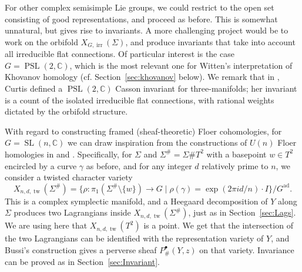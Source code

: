 \documentclass [11pt]{amsart}
\theoremstyle{remark}
\def\cc {{\mathbb{C}}}
\def\Gad{G^{\operatorname{ad}}}
\def\psl {{\operatorname{PSL}(2, \cc)}}
\def\sln {{\operatorname{SL}(n, \cc)}}
\def\Char {X}
\def\irr{\operatorname{irr}}
\def\tw{\operatorname{tw}}
\begin{document}
For other complex semisimple Lie groups, we could restrict to the open set consisting of good representations, and proceed as before. This is somewhat unnatural, but gives rise to invariants. A more challenging project would be to work on the orbifold $\Char_{G, \irr}(\Sigma)$, and produce invariants that take into account all irreducible flat connections. Of particular interest is the case $G = \psl$, which is the most relevant one for Witten's interpretation of Khovanov homology (cf. Section~\ref{sec:khovanov} below). We remark that in \cite{CurtisPSL}, Curtis defined a $\psl$ Casson invariant for three-manifolds; her invariant is a count of the isolated irreducible flat connections, with rational weights dictated by the orbifold structure.

With regard to constructing framed (sheaf-theoretic) Floer cohomologies, for $G=\sln$ we can draw inspiration from the constructions of $U(n)$ Floer homologies in \cite{KMknots} and \cite{WWFloerField}. Specifically, for $\Sigma$ and $\Sigma^{\#} = \Sigma \# T^2$ with a basepoint $w \in T^2$ encircled by a curve $\gamma$ as before, and for any integer $d$ relatively prime to $n$, we consider a twisted character variety
$$ \Char_{n, d, \tw}(\Sigma^{\#}) = \{\rho: \pi_1(\Sigma^{\#} \setminus \{w\}) \to G \mid \rho(\gamma)= \exp({2\pi i d/n} ) \cdot I \} / \Gad.$$
This is a complex symplectic manifold, and a Heegaard decomposition of $Y$ along $\Sigma$ produces two Lagrangians inside $\Char_{n, d, \tw}(\Sigma^{\#})$, just as in Section~\ref{sec:Lags}. We are using here that $\Char_{n, d, \tw}(T^2)$ is a point. We get that the intersection of the two Lagrangians can be identified with the representation variety of $Y$, and Bussi's construction gives a perverse sheaf $P^{\bullet}_{\#}(Y,z)$ on that variety. Invariance can be proved as in Section~\ref{sec:Invariant}.
\end{document}
